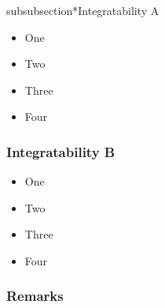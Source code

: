 subsubsection*{Integratability A}
\begin{itemize}
	\item One 
	\item Two 
	\item Three 
	\item Four 
\end{itemize}
\subsubsection*{Integratability B}
\begin{itemize}
	\item One 
	\item Two 
	\item Three 
	\item Four 
\end{itemize}
\subsubsection*{Remarks}